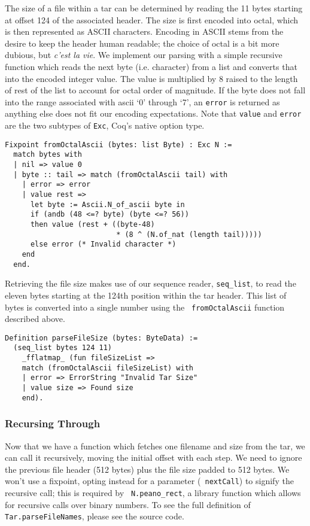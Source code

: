 \documentclass[nocopyrightspace]{sigplanconf}
\begin{document}
The size of a file within a tar can be determined by reading the 11 bytes
starting at offset 124 of the associated header. The size is first encoded into
octal, which is then represented as ASCII characters. Encoding in ASCII stems
from the desire to keep the header human readable; the choice of octal is a
bit more dubious, but {\it c'est la vie}. We implement our parsing with a
simple recursive function which reads the next byte (i.e. character) from a
list and converts that into the encoded integer value. The value is multiplied
by 8 raised to the length of rest of the list to account for octal order of
magnitude. If the byte does not fall into the range associated with ascii `0'
through `7', an {\tt error} is returned as anything else does not fit our
encoding expectations. Note that {\tt value} and {\tt error} are the two
subtypes of {\tt Exc}, Coq's native option type.

\begin{lstlisting}
Fixpoint fromOctalAscii (bytes: list Byte) : Exc N :=
  match bytes with
  | nil => value 0
  | byte :: tail => match (fromOctalAscii tail) with
    | error => error
    | value rest => 
      let byte := Ascii.N_of_ascii byte in
      if (andb (48 <=? byte) (byte <=? 56))
      then value (rest + ((byte-48)
                          * (8 ^ (N.of_nat (length tail)))))
      else error (* Invalid character *)
    end
  end.
\end{lstlisting}

Retrieving the file size makes use of our sequence reader, {\tt seq\_list}, to
read the eleven bytes starting at the 124th position within the tar header.
This list of bytes is converted into a single number using the {\tt
fromOctalAscii} function described above.

\begin{lstlisting}
Definition parseFileSize (bytes: ByteData) :=
  (seq_list bytes 124 11)
    _fflatmap_ (fun fileSizeList =>
    match (fromOctalAscii fileSizeList) with
    | error => ErrorString "Invalid Tar Size"
    | value size => Found size
    end).
\end{lstlisting}

\subsubsection{Recursing Through}

Now that we have a function which fetches one filename and size from the tar,
we can call it recursively, moving the initial offset with each step.  We need
to ignore the previous file header (512 bytes) plus the file size padded to
512 bytes. We won't use a fixpoint, opting instead for a parameter ({\tt
nextCall}) to signify the recursive call; this is required by {\tt
N.peano\_rect}, a library function which allows for recursive calls over
binary numbers. To see the full definition of {\tt Tar.parseFileNames}, please
see the source code.
\end{document}
